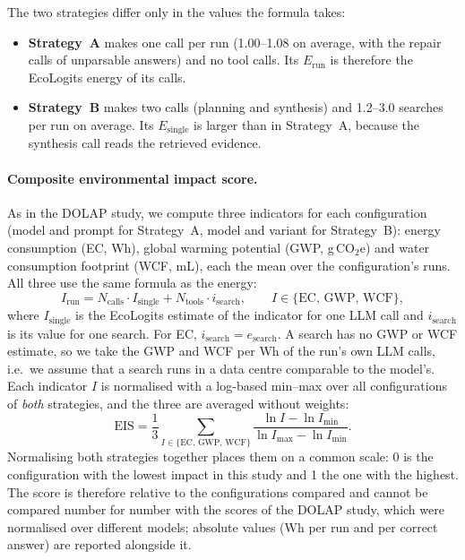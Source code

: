 The two strategies differ only in the values the formula takes:
\begin{itemize}
\item \textbf{Strategy~A} makes one call per run (1.00--1.08 on average, with the repair calls of unparsable answers) and
no tool calls. Its $E_{\text{run}}$ is therefore the EcoLogits energy of its calls.
\item \textbf{Strategy~B} makes two calls (planning and synthesis) and 1.2--3.0 searches per run on average. Its
$E_{\text{single}}$ is larger than in Strategy~A, because the synthesis call reads the retrieved evidence.
\end{itemize}

\paragraph{Composite environmental impact score.}
As in the DOLAP study, we compute three indicators for each configuration (model and prompt for Strategy~A, model and
variant for Strategy~B): energy consumption (EC, Wh), global warming potential (GWP, g\,CO$_2$e) and water consumption
footprint (WCF, mL), each the mean over the configuration's runs. All three use the same formula as the energy:
\[
I_{\text{run}} = N_{\text{calls}} \cdot I_{\text{single}} + N_{\text{tools}} \cdot i_{\text{search}},
\qquad I \in \{\mathrm{EC},\,\mathrm{GWP},\,\mathrm{WCF}\},
\]
where $I_{\text{single}}$ is the EcoLogits estimate of the indicator for one LLM call and $i_{\text{search}}$ is its
value for one search. For EC, $i_{\text{search}} = e_{\text{search}}$. A search has no GWP or WCF estimate, so we take
the GWP and WCF per Wh of the run's own LLM calls, i.e.\ we assume that a search runs in a data centre comparable to the
model's. Each indicator $I$ is normalised with a log-based min--max over all configurations of \emph{both} strategies,
and the three are averaged without weights:
\[
\mathrm{EIS} = \frac{1}{3} \sum_{I \in \{\mathrm{EC},\,\mathrm{GWP},\,\mathrm{WCF}\}}
\frac{\ln I - \ln I_{\min}}{\ln I_{\max} - \ln I_{\min}} .
\]
Normalising both strategies together places them on a common scale: 0 is the configuration with the lowest impact in
this study and 1 the one with the highest. The score is therefore relative to the configurations compared and cannot be
compared number for number with the scores of the DOLAP study, which were normalised over different models; absolute
values (Wh per run and per correct answer) are reported alongside it.

